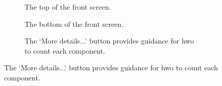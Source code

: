 \begin{figure}	
	\centering
	\begin{subfigure}[t]{1.25in}
		\centering
		\setlength\fboxsep{0pt}
\setlength\fboxrule{0.5pt}
		\caption{The top of the front screen. }\label{fig:pond_overview_a}
	\end{subfigure}
\quad
\begin{subfigure}[t]{1.25in}
		\centering
		\setlength\fboxsep{0pt}
\setlength\fboxrule{0.5pt}
		\caption{The bottom of the front screen. }\label{fig:pond_overview_b}
	\end{subfigure}
\quad
\begin{subfigure}[t]{1.25in}
		\centering
		\setlength\fboxsep{0pt}
\setlength\fboxrule{0.5pt}
		\caption{The `More details...' button provides guidance for hwo to count each component.}\label{fig:pond_overview_c}

\end{subfigure}
\end{figure}
